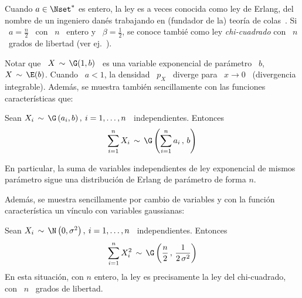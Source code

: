 Cuando $a \in \Nset^*$ es entero, la ley es a veces conocida como ley de Erlang,
del nombre  de un ingeniero dan\'es  trabajando en (fundador de  la) teor\'ia de
colas~\cite{Cox62, Erl09, Erl25, BroHal48}.  Si \  $a = \frac{n}{2}$ \ con \ $n$
\ entero y  \ $\beta = \frac12$, se conoce tambi\'e  como ley {\em chi-cuadrado}
con \ $n$ \ grados de libertad (ver ej.~\cite{JohKot95:v1}).

Notar que \ $X \, \sim \,  \G(1,b)$ \ es una variable exponencial de par\'ametro
\ $b$,  \ie \ $X  \, \sim \,  \E(b)$. Cuando \  $a < 1$,  la densidad \  $p_X$ \
diverge  para \  $x  \to 0$  \  (divergencia integrable).  Adem\'as, se  muestra
tambi\'en sencillamente con las funciones caracter\'isticas que:
%
\begin{lema}[Stabilidad]
\label{Lem:MP:StabilidadGamma}
%
  Sean $X_i  \, \sim  \, \G\left( a_i  , b  \right), \: i  = 1 ,  \ldots ,  n$ \
  independientes. Entonces
  \[
  \sum_{i=1}^n X_i \, \sim \, \G\left( \sum_{i=1}^n a_i \, , \, b \right)
  \]
\end{lema}
%
En particular, la suma de  variables independientes de ley exponencial de mismos
par\'ametro sigue una distribuci\'on de Erlang de par\'ametro de forma $n$.

Adem\'as, se  muestra sencillamente por cambio  de variables y  con la funci\'on
caracter\'istica un v\'inculo con variables gaussianas:
%
\begin{lema}
\label{Lem:MP:VinculoGammaGaussiana}
%
  Sean $X_i \, \sim \,  \N\left( 0 , \sigma^2 \right), \: i = 1  , \ldots , n$ \
  independientes. Entonces
  \[
  \sum_{i=1}^n  X_i^2 \,  \sim \,  \G\left( \frac{n}{2}  \, ,  \,  \frac{1}{2 \,
      \sigma^2} \right)
  \]
  En  esta situaci\'on,  con  $n$ entero,  la  ley es  precisamente  la ley  del
  chi-cuadrado, con \ $n$ \ grados de libertad.
\end{lema}

